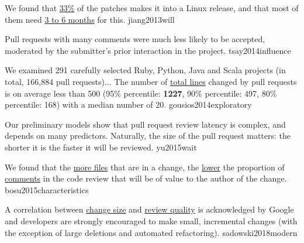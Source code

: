 \documentclass{article}
\begin{document}

  {We found that \ul{33\%} of the patches makes it into a Linux release, and that most of them need \ul{3 to 6 months} for this.}
  {jiang2013will}



  {Pull requests with many comments were much less likely to be accepted, moderated by the submitter's prior interaction in the project.}
  {tsay2014influence}

  {We examined 291 carefully selected Ruby, Python, Java and Scala projects (in total, 166,884 pull requests)... The number of \ul{total lines} changed by pull requests is on average less than 500 (95\% percentile: \textbf{1227}, 90\% percentile: 497, 80\% percentile: 168) with a median number of 20.}
  {gousios2014exploratory}

  {Our preliminary models show that pull request review latency is complex, and depends on many predictors. Naturally, the size of the pull request matters: the shorter it is the faster it will be reviewed.}
  {yu2015wait}

  {We found that the \ul{more files} that are in a change, the \ul{lower} the proportion of \ul{comments} in the code review that will be of value to the author of the change.}
  {bosu2015characteristics}

  {A correlation between \ul{change size} and \ul{review quality} is acknowledged by Google and developers are strongly encouraged to make small, incremental changes (with the exception of large deletions and automated refactoring).}
  {sadowski2018modern}
\end{document}
